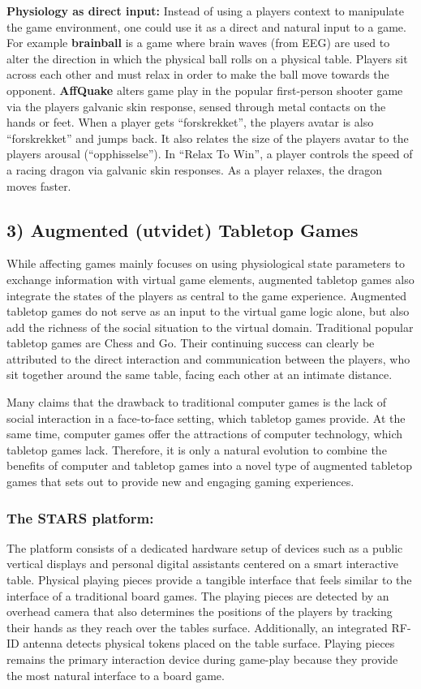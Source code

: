       {\bf Physiology as direct input:} Instead of using a players context to manipulate the game environment, one could use it as a direct and natural input to a game. For example {\bf brainball} is a game where brain waves (from EEG) are used to alter the direction in which the physical ball rolls on a physical table. Players sit across each other and must relax in order to make the ball move towards the opponent. 
      {\bf AffQuake} alters game play in the popular first-person shooter game via the players galvanic skin response, sensed through metal contacts on the hands or feet. When a player gets ``forskrekket'', the players avatar is also ``forskrekket'' and jumps back. It also relates the size of the players avatar to the players arousal (``opphisselse''). In ``Relax To Win'', a player controls the speed of a racing dragon via galvanic skin responses. As a player relaxes, the dragon moves faster. 

    \subsection*{3) Augmented (utvidet) Tabletop Games}
    While affecting games mainly focuses on using physiological state parameters to exchange information with virtual game elements, augmented tabletop games also integrate the states of the players as central to the game experience. Augmented tabletop games do not serve as an input to the virtual game logic alone, but also add the richness of the social situation to the virtual domain. Traditional popular tabletop games are Chess and Go. Their continuing success can clearly be attributed to the direct interaction and communication between the players, who sit together around the same table, facing each other at an intimate distance. 
    
    Many claims that the drawback to traditional computer games is the lack of social interaction in a face-to-face setting, which tabletop games provide. At the same time, computer games offer the attractions of computer technology, which tabletop games lack. Therefore, it is only a natural evolution to combine the benefits of computer and tabletop games into a novel type of augmented tabletop games that sets out to provide new and engaging gaming experiences. 

      \subsubsection*{The STARS platform:} The platform consists of a dedicated hardware setup of devices such as a public vertical displays and personal digital assistants centered on a smart interactive table. Physical playing pieces provide a tangible interface that feels similar to the interface of a traditional board games. The playing pieces are detected by an overhead camera that also determines the positions of the players by tracking their hands as they reach over the tables surface. Additionally, an integrated RF-ID antenna detects physical tokens placed on the table surface. Playing pieces remains the primary interaction device during game-play because they provide the most natural interface to a board game.

